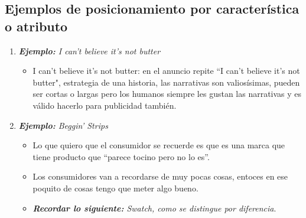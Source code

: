 \subsection{Ejemplos de posicionamiento por característica o atributo}
\begin{enumerate}
    \item \emph{\textbf{Ejemplo: }I can't believe it's not butter}        
        \begin{itemize}
            \item I can't believe it's not butter: en el anuncio repite ``I can't believe it's not butter", estrategia de una historia, las narrativas son valiosísimas, pueden ser cortas o largas pero los humanos siempre les gustan las narrativas y es válido hacerlo para publicidad también.
        \end{itemize}
    
    \item \emph{\textbf{Ejemplo: }Beggin' Strips}
        \begin{itemize}
            \item Lo que quiero que el consumidor se recuerde es que es una marca que tiene producto que ``parece tocino pero no lo es''.
        \end{itemize}
        \begin{itemize}[label=\#]
            \item Los consumidores van a recordarse de muy pocas cosas, entoces en ese poquito de cosas tengo que meter algo bueno.
            \item \emph{\textbf{Recordar lo siguiente: }Swatch, como se distingue por diferencia}.
        \end{itemize}
\end{enumerate}

